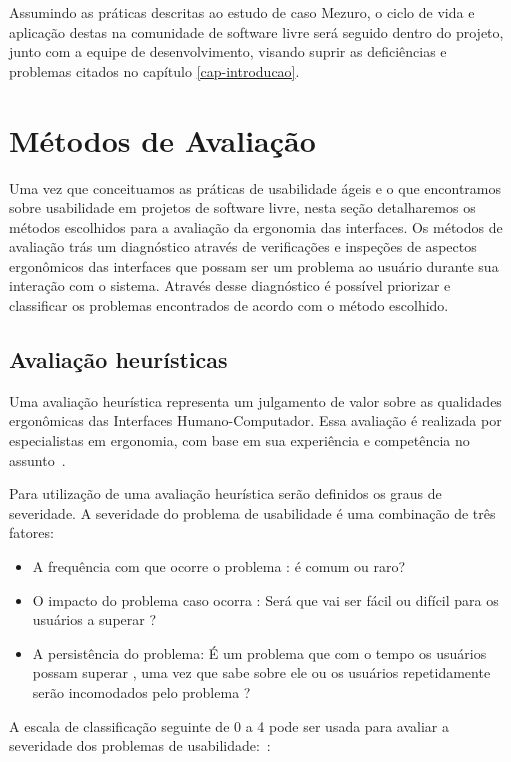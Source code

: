 Assumindo as práticas descritas ao estudo de caso Mezuro, o ciclo de vida e aplicação destas na comunidade de software livre será seguido dentro do projeto, junto com a equipe de desenvolvimento, visando suprir as deficiências e problemas citados no capítulo \ref{cap-introducao}.

\section{Métodos de Avaliação}
\label{metodos-avaliacao}

Uma  vez que conceituamos as práticas de usabilidade ágeis e o que 
encontramos sobre usabilidade em projetos de software livre, nesta seção
detalharemos os métodos escolhidos para a avaliação da ergonomia das interfaces. Os métodos de avaliação trás um diagnóstico através de verificações e inspeções de aspectos ergonômicos das interfaces que possam ser um problema ao usuário durante sua interação com o sistema. Através desse diagnóstico é possível priorizar e classificar os problemas encontrados de acordo com o método escolhido.

\subsection{Avaliação heurísticas}
Uma avaliação heurística representa um julgamento de valor sobre as qualidades
ergonômicas das Interfaces Humano-Computador. Essa avaliação é realizada por
especialistas em ergonomia, com base em sua experiência e competência no
assunto~\cite{cybis2010}.

%
Para utilização de uma avaliação heurística serão definidos os graus de
severidade. A severidade do problema de usabilidade é uma combinação de três fatores:
\begin{itemize}
\item A frequência com que ocorre o problema : é comum ou raro?
\item O impacto do problema caso ocorra : Será que vai ser fácil ou difícil para os usuários a superar ?
\item A persistência do problema: É um problema que com o tempo os usuários possam superar , uma vez que sabe sobre ele ou os usuários repetidamente serão incomodados pelo problema ?
\end{itemize}

A escala de classificação seguinte de 0 a 4 pode ser usada para avaliar a severidade dos problemas de usabilidade:~\cite{nielsen1995severity}:

